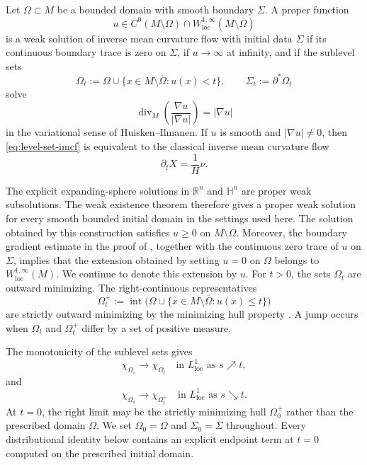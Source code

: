 \documentclass[11pt,reqno]{amsart}
\numberwithin{equation}{section}
\theoremstyle{definition}
\newcommand{\R}{\mathbb R}
\newcommand{\diver}{\operatorname{div}}
\newcommand{\HH}{\mathbb H}
\begin{document}
Let $\Omega\subset M$ be a bounded domain with smooth boundary $\Sigma$.  A proper function
\begin{equation*}
    u\in C^0(M\setminus\Omega)
      \cap W_{\mathrm{loc}}^{1,\infty}(M\setminus\overline\Omega)
\end{equation*}
is a weak solution of inverse mean curvature flow with initial data $\Sigma$ if its continuous boundary trace is zero on $\Sigma$, if $u\to\infty$ at infinity, and if the sublevel sets
\begin{equation*}
    \Omega_t:=\Omega\cup\{x\in M\setminus\overline\Omega:u(x)<t\},
    \qquad
    \Sigma_t:=\partial^*\Omega_t
\end{equation*}
solve
\begin{equation}\label{eq:level-set-imcf}
    \diver_M\left(\frac{\nabla u}{|\nabla u|}\right)=|\nabla u|
\end{equation}
in the variational sense of Huisken--Ilmanen.  If $u$ is smooth and $|\nabla u|\neq0$, then \eqref{eq:level-set-imcf} is equivalent to the classical inverse mean curvature flow \cite{Gerhardt1990,Gerhardt2011,Urbas1990}
\begin{equation*}
    \partial_t X=\frac{1}{H}\nu.
\end{equation*}

The explicit expanding-sphere solutions in $\R^n$ and $\HH^n$ are proper weak subsolutions.  The weak existence theorem \cite[Theorem~3.1]{HI2001} therefore gives a proper weak solution for every smooth bounded initial domain in the settings used here. The solution obtained by this construction satisfies
$u\geq0$ on $M\setminus\Omega$. Moreover, the boundary gradient estimate in the proof of \cite[Theorem~3.1]{HI2001}, together with the continuous zero trace of $u$ on $\Sigma$, implies that the extension obtained by setting $u=0$ on $\Omega$ belongs to $W_{\mathrm{loc}}^{1,\infty}(M)$. We continue to denote this extension by $u$. For $t>0$, the sets $\Omega_t$ are outward minimizing.  The right-continuous representatives
\begin{equation*}
    \Omega_t^+:=\operatorname{int}\bigl(\Omega\cup\{x\in M\setminus\overline\Omega:u(x)\leq t\}\bigr)
\end{equation*}
are strictly outward minimizing by the minimizing hull property \cite[Minimizing Hull Property~1.4]{HI2001}.  A jump occurs when $\Omega_t$ and $\Omega_t^+$ differ by a set of positive measure.

The monotonicity of the sublevel sets gives
\begin{equation*}
    \chi_{\Omega_s}\longrightarrow\chi_{\Omega_t}
    \quad\text{in }L^1_{\mathrm{loc}}\text{ as }s\nearrow t,
\end{equation*}
and
\begin{equation*}
    \chi_{\Omega_s}\longrightarrow\chi_{\Omega_t^+}
    \quad\text{in }L^1_{\mathrm{loc}}\text{ as }s\searrow t.
\end{equation*}
At $t=0$, the right limit may be the strictly minimizing hull $\Omega_0^+$ rather than the prescribed domain $\Omega$.  We set $\Omega_0=\Omega$ and $\Sigma_0=\Sigma$ throughout.  Every distributional identity below contains an explicit endpoint term at $t=0$ computed on the prescribed initial domain.
\end{document}
